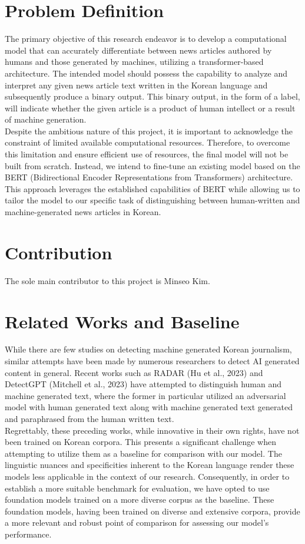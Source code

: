 \documentclass{article}
\begin{document}
\section{Problem Definition}
\null\quad The primary objective of this research endeavor is to develop a computational model that can accurately differentiate between news articles authored by humans and those generated by machines, utilizing a transformer-based architecture.
The intended model should possess the capability to analyze and interpret any given news article text written in the Korean language and subsequently produce a binary output.
This binary output, in the form of a label, will indicate whether the given article is a product of human intellect or a result of machine generation. \\
\null\quad Despite the ambitious nature of this project, it is important to acknowledge the constraint of limited available computational resources.
Therefore, to overcome this limitation and ensure efficient use of resources, the final model will not be built from scratch.
Instead, we intend to fine-tune an existing model based on the BERT (Bidirectional Encoder Representations from Transformers) architecture.
This approach leverages the established capabilities of BERT while allowing us to tailor the model to our specific task of distinguishing between human-written and machine-generated news articles in Korean.

\section{Contribution}
\null\quad The sole main contributor to this project is Minseo Kim.

\section{Related Works and Baseline}
\null\quad While there are few studies on detecting machine generated Korean journalism, similar attempts have been made by numerous researchers to detect AI generated content in general.
Recent works such as RADAR (Hu et al., 2023) and DetectGPT (Mitchell et al., 2023) have attempted to distinguish human and machine generated text,
where the former in particular utilized an adversarial model with human generated text along with machine generated text generated and paraphrased from the human written text. \\
\null\quad Regrettably, these preceding works, while innovative in their own rights, have not been trained on Korean corpora.
This presents a significant challenge when attempting to utilize them as a baseline for comparison with our model.
The linguistic nuances and specificities inherent to the Korean language render these models less applicable in the context of our research.
Consequently, in order to establish a more suitable benchmark for evaluation, we have opted to use foundation models trained on a more diverse corpus as the baseline.
These foundation models, having been trained on diverse and extensive corpora, provide a more relevant and robust point of comparison for assessing our model's performance.
\end{document}
